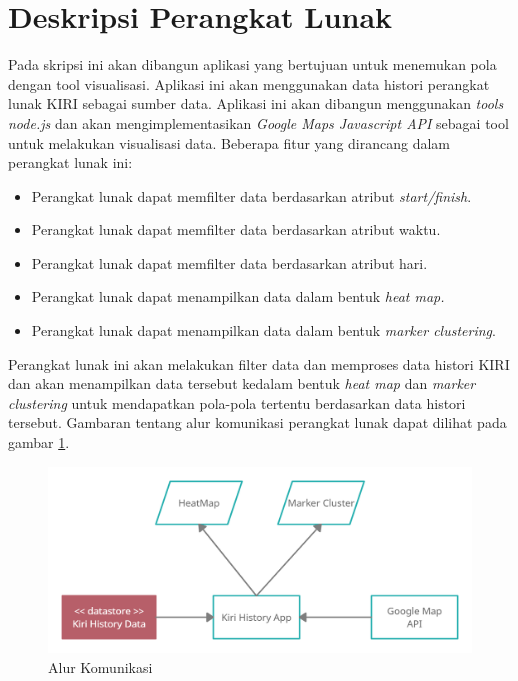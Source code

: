


\section{Deskripsi Perangkat Lunak}
\label{sec:deskripsiPL}
Pada skripsi ini akan dibangun aplikasi yang bertujuan untuk menemukan pola dengan tool visualisasi. Aplikasi ini akan menggunakan data histori perangkat lunak KIRI sebagai sumber data. Aplikasi ini akan dibangun menggunakan \textit{tools node.js} dan akan mengimplementasikan \textit{Google Maps Javascript API} sebagai tool untuk melakukan visualisasi data. Beberapa fitur yang dirancang dalam perangkat lunak ini:
\begin{itemize}
\item Perangkat lunak dapat memfilter data berdasarkan atribut \textit{start/finish}.
\item Perangkat lunak dapat memfilter data berdasarkan atribut waktu.
\item Perangkat lunak dapat memfilter data berdasarkan atribut hari.
\item Perangkat lunak dapat menampilkan data dalam bentuk \textit{heat map.}
\item Perangkat lunak dapat menampilkan data dalam bentuk \textit{marker clustering}.
\end{itemize}
Perangkat lunak ini akan melakukan filter data dan memproses data histori KIRI dan akan menampilkan data tersebut kedalam bentuk \textit{heat map} dan \textit{marker clustering} untuk mendapatkan pola-pola tertentu berdasarkan data histori tersebut. Gambaran tentang alur komunikasi perangkat lunak dapat dilihat pada gambar \ref{fig:alurKomunikasi}.

\begin{figure}[H]
	\centering  
	\includegraphics[scale=0.3]{Gambar/software-flow.png}  
	\caption[Alur Komunikasi]{Alur Komunikasi} 
	\label{fig:alurKomunikasi} 
\end{figure} 

